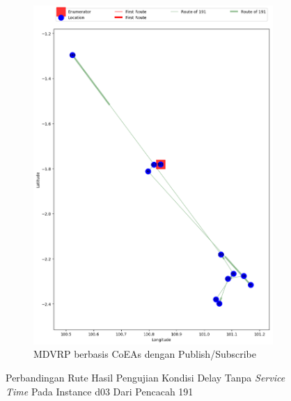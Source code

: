 \begin{figure}[H]\ContinuedFloat
	\centering
	\begin{subfigure}[t]{\textwidth}
		\centering
		\includegraphics[width=\textwidth]{Resources/Images/delayed_3/real_m15_n100_delayed_3_191_pubsub_coes}
		\caption{MDVRP berbasis CoEAs dengan Publish/Subscribe}
		\label{fig:real_m15_n100_delayed_3_191_pubsub_coes}
	\end{subfigure}
	\caption{Perbandingan Rute Hasil Pengujian Kondisi Delay Tanpa \textit{Service Time} Pada Instance d03 Dari Pencacah 191}
	\label{fig:real_m15_n100_delayed_3_191_contd}
\end{figure}


